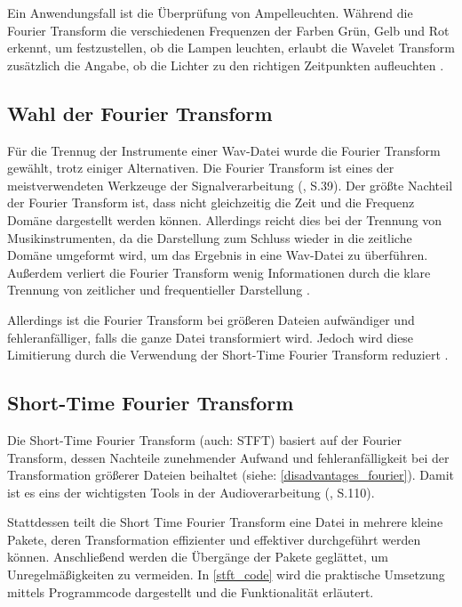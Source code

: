 \par

Ein Anwendungsfall ist die Überprüfung von Ampelleuchten. Während die Fourier Transform die verschiedenen Frequenzen der Farben Grün, Gelb und Rot erkennt, um festzustellen, ob die Lampen leuchten, erlaubt die Wavelet Transform zusätzlich die Angabe, ob die Lichter zu den richtigen Zeitpunkten aufleuchten \parencite{wavelets}.

%
\subsection{Wahl der Fourier Transform}
%

Für die Trennug der Instrumente einer Wav-Datei wurde die Fourier Transform gewählt, trotz einiger Alternativen. Die Fourier Transform ist eines der meistverwendeten Werkzeuge der Signalverarbeitung (\cite{fundamentals_of_music_processing}, S.39). Der größte Nachteil der Fourier Transform ist, dass nicht gleichzeitig die Zeit und die Frequenz Domäne dargestellt werden können. Allerdings reicht dies bei der Trennung von Musikinstrumenten, da die Darstellung zum Schluss wieder in die zeitliche Domäne umgeformt wird, um das Ergebnis in eine Wav-Datei zu überführen. Außerdem verliert die Fourier Transform wenig Informationen durch die klare Trennung von zeitlicher und frequentieller Darstellung \parencite{Parsons_2000}.

\par

Allerdings ist die Fourier Transform bei größeren Dateien aufwändiger und fehleranfälliger, falls die ganze Datei transformiert wird. Jedoch wird diese Limitierung durch die Verwendung der Short-Time Fourier Transform reduziert \parencite{Prashanth_2017}.

%
\subsection{Short-Time Fourier Transform}
%

Die Short-Time Fourier Transform (auch: STFT) basiert auf der Fourier Transform, dessen Nachteile zunehmender Aufwand und fehleranfälligkeit bei der Transformation größerer Dateien beihaltet (siehe: \cref{disadvantages_fourier}). Damit ist es eins der wichtigsten Tools in der Audioverarbeitung (\cite{fundamentals_of_music_processing}, S.110).

\par

Stattdessen teilt die Short Time Fourier Transform eine Datei in mehrere kleine Pakete, deren Transformation effizienter und effektiver durchgeführt werden können. Anschließend werden die Übergänge der Pakete geglättet, um Unregelmäßigkeiten zu vermeiden. In \cref{stft_code} wird die praktische Umsetzung mittels Programmcode dargestellt und die Funktionalität erläutert.